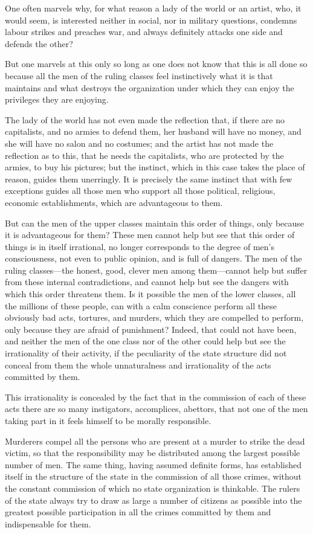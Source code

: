 \documentclass{book}
\begin{document}
One often marvels why, for what reason a lady of the world or an artist, who, it would seem, is interested neither in social, nor in military questions, condemns labour strikes and preaches war, and always definitely attacks one side and defends the other?

But one marvels at this only so long as one does not know that this is all done so because all the men of the ruling classes feel instinctively what it is that maintains and what destroys the organization under which they can enjoy the privileges they are enjoying.

The lady of the world has not even made the reflection that, if there are no capitalists, and no armies to defend them, her husband will have no money, and she will have no salon and no costumes; and the artist has not made the reflection as to this, that he needs the capitalists, who are protected by the armies, to buy his pictures; but the instinct, which in this case takes the place of reason, guides them unerringly. It is precisely the same instinct that with few exceptions guides all those men who support all those political, religious, economic establishments, which are advantageous to them.

But can the men of the upper classes maintain this order of things, only because it is advantageous for them? These men cannot help but see that this order of things is in itself irrational, no longer corresponds to the degree of men’s consciousness, not even to public opinion, and is full of dangers. The men of the ruling classes—the honest, good, clever men among them—cannot help but suffer from these internal contradictions, and cannot help but see the dangers with which this order threatens them. Is it possible the men of the lower classes, all the millions of these people, can with a calm conscience perform all these obviously bad acts, tortures, and murders, which they are compelled to perform, only because they are afraid of punishment? Indeed, that could not have been, and neither the men of the one class nor of the other could help but see the irrationality of their activity, if the peculiarity of the state structure did not conceal from them the whole unnaturalness and irrationality of the acts committed by them.

This irrationality is concealed by the fact that in the commission of each of these acts there are so many instigators, accomplices, abettors, that not one of the men taking part in it feels himself to be morally responsible.

Murderers compel all the persons who are present at a murder to strike the dead victim, so that the responsibility may be distributed among the largest possible number of men. The same thing, having assumed definite forms, has established itself in the structure of the state in the commission of all those crimes, without the constant commission of which no state organization is thinkable. The rulers of the state always try to draw as large a number of citizens as possible into the greatest possible participation in all the crimes committed by them and indispensable for them.
\end{document}
